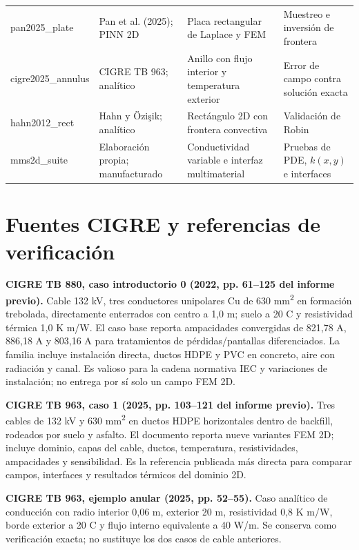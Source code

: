 \documentclass[11pt,a4paper,oneside]{report}
\begin{document}
\begin{landscape}
\begin{longtable}{p{2.0cm}p{2.8cm}p{3.8cm}p{4.8cm}}
pan2025\_plate & Pan et al. (2025); PINN 2D & Placa rectangular de Laplace y FEM & Muestreo e inversi\'on de frontera \\
cigre2025\_annulus & CIGRE TB 963; anal\'itico & Anillo con flujo interior y temperatura exterior & Error de campo contra soluci\'on exacta \\
hahn2012\_rect & Hahn y \"Ozi\c{s}ik; anal\'itico & Rect\'angulo 2D con frontera convectiva & Validaci\'on de Robin \\
mms2d\_suite & Elaboraci\'on propia; manufacturado & Conductividad variable e interfaz multimaterial & Pruebas de PDE, $k(x,y)$ e interfaces \\
\bottomrule
\end{longtable}
\end{landscape}

\chapter*{Fuentes CIGRE y referencias de verificaci\'on}
\textbf{CIGRE TB 880, caso introductorio 0 (2022, pp. 61--125 del informe previo).} Cable 132 kV, tres conductores unipolares Cu de 630 mm\textsuperscript{2} en formaci\'on trebolada, directamente enterrados con centro a 1,0 m; suelo a 20 \textdegree C y resistividad t\'ermica 1,0 K m/W. El caso base reporta ampacidades convergidas de 821,78 A, 886,18 A y 803,16 A para tratamientos de p\'erdidas/pantallas diferenciados. La familia incluye instalaci\'on directa, ductos HDPE y PVC en concreto, aire con radiaci\'on y canal. Es valioso para la cadena normativa IEC y variaciones de instalaci\'on; no entrega por s\'i solo un campo FEM 2D.

\textbf{CIGRE TB 963, caso 1 (2025, pp. 103--121 del informe previo).} Tres cables de 132 kV y 630 mm\textsuperscript{2} en ductos HDPE horizontales dentro de backfill, rodeados por suelo y asfalto. El documento reporta nueve variantes FEM 2D; incluye dominio, capas del cable, ductos, temperatura, resistividades, ampacidades y sensibilidad. Es la referencia publicada m\'as directa para comparar campos, interfaces y resultados t\'ermicos del dominio 2D.

\textbf{CIGRE TB 963, ejemplo anular (2025, pp. 52--55).} Caso anal\'itico de conducci\'on con radio interior 0,06 m, exterior 20 m, resistividad 0,8 K m/W, borde exterior a 20 \textdegree C y flujo interno equivalente a 40 W/m. Se conserva como verificaci\'on exacta; no sustituye los dos casos de cable anteriores.
\end{document}
